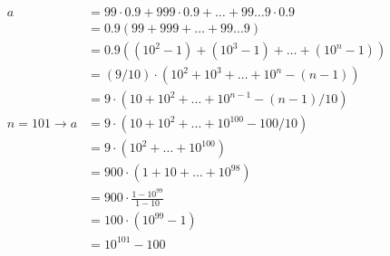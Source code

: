 \begin{align*}
a 
& = 99 \cdot 0.9 + 999 \cdot 0.9 + \ldots + 99{\ldots}9 \cdot 0.9
\\
& = 0.9 (99 + 999 + \ldots + 99{\ldots}9)
\\
& = 0.9 ((10^{2}-1) + (10^{3}-1) + \ldots + (10^{n}-1))
\\
& = (9/10) \cdot (10^{2}+10^{3}+\ldots+10^{n}-(n-1))
\\
& = 9 \cdot (10+10^{2}+\ldots+10^{n-1}-(n-1)/10)
\\
n = 101
\to 
a
& = 9 \cdot (10+10^{2}+\ldots+10^{100}-100/10)
\\
& = 9 \cdot (10^{2}+\ldots+10^{100})
\\
& = 900 \cdot (1+10+\ldots+10^{98})
\\
& = 900 \cdot \frac{1-10^{99}}{1-10}
\\
& = 100 \cdot (10^{99}-1)
\\
& = 10^{101}-100
\end{align*}